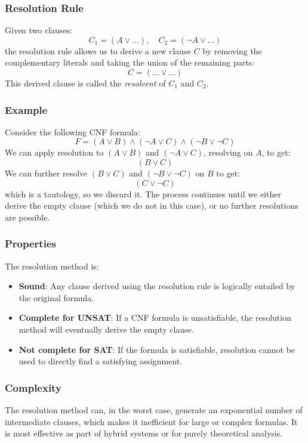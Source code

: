 \documentclass{article}
\begin{document}
\subsubsection{Resolution Rule}
Given two clauses:
\[
C_1 = (A \lor \ldots), \quad C_2 = (\neg A \lor \ldots)
\]
the resolution rule allows us to derive a new clause \( C \) by removing the complementary literals and taking the union of the remaining parts:
\[
C = (\ldots \lor \ldots)
\]
This derived clause is called the \emph{resolvent} of \( C_1 \) and \( C_2 \).

\subsubsection{Example}
Consider the following CNF formula:
\[
F = (A \lor B) \land (\neg A \lor C) \land (\neg B \lor \neg C)
\]
We can apply resolution to \( (A \lor B) \) and \( (\neg A \lor C) \), resolving on \( A \), to get:
\[
(B \lor C)
\]
We can further resolve \( (B \lor C) \) and \( (\neg B \lor \neg C) \) on \( B \) to get:
\[
(C \lor \neg C)
\]
which is a tautology, so we discard it. The process continues until we either derive the empty clause (which we do not in this case), or no further resolutions are possible.

\subsubsection{Properties}
The resolution method is:
\begin{itemize}
    \item \textbf{Sound}: Any clause derived using the resolution rule is logically entailed by the original formula.
    \item \textbf{Complete for UNSAT}: If a CNF formula is unsatisfiable, the resolution method will eventually derive the empty clause.
    \item \textbf{Not complete for SAT}: If the formula is satisfiable, resolution cannot be used to directly find a satisfying assignment.
\end{itemize}

\subsubsection{Complexity}
The resolution method can, in the worst case, generate an exponential number of intermediate clauses, which makes it inefficient for large or complex formulas. It is most effective as part of hybrid systems or for purely theoretical analysis.
\end{document}
